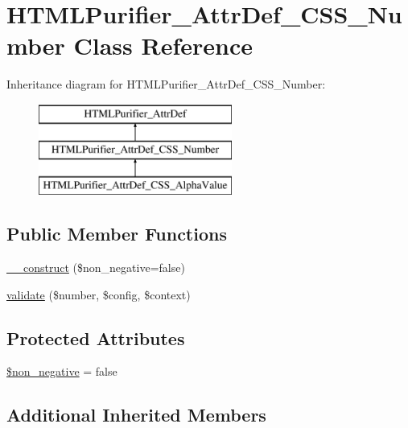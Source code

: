 \hypertarget{classHTMLPurifier__AttrDef__CSS__Number}{\section{H\+T\+M\+L\+Purifier\+\_\+\+Attr\+Def\+\_\+\+C\+S\+S\+\_\+\+Number Class Reference}
\label{classHTMLPurifier__AttrDef__CSS__Number}
}
Inheritance diagram for H\+T\+M\+L\+Purifier\+\_\+\+Attr\+Def\+\_\+\+C\+S\+S\+\_\+\+Number\+:\begin{figure}[H]
\begin{center}
\leavevmode
\includegraphics[height=3.000000cm]{classHTMLPurifier__AttrDef__CSS__Number}
\end{center}
\end{figure}
\subsection*{Public Member Functions}
\begin{DoxyCompactItemize}
\item 
\hyperlink{classHTMLPurifier__AttrDef__CSS__Number_a3a98acf98781c6758b51f275749cdd79}{\+\_\+\+\_\+construct} (\$non\+\_\+negative=false)
\item 
\hyperlink{classHTMLPurifier__AttrDef__CSS__Number_a244b9c43b189f376676d2b0b67d1b4cf}{validate} (\$number, \$config, \$context)
\end{DoxyCompactItemize}
\subsection*{Protected Attributes}
\begin{DoxyCompactItemize}
\item 
\hyperlink{classHTMLPurifier__AttrDef__CSS__Number_a29cdc45b8b5dd9f5fc613996975044ee}{\$non\+\_\+negative} = false
\end{DoxyCompactItemize}
\subsection*{Additional Inherited Members}


